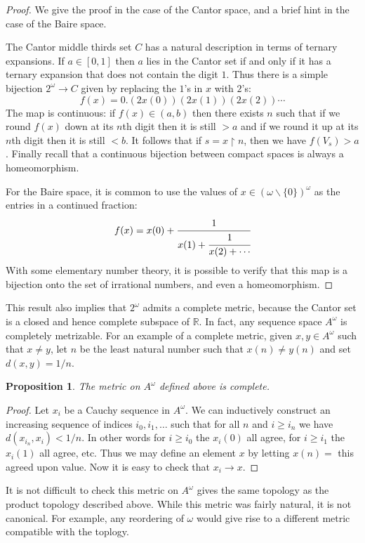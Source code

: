 \documentclass[11pt,oneside]{amsbook}
\newcommand{\R}{\mathbb R}
\theoremstyle{definition}
\theoremstyle{plain}
\newtheorem{proposition}[theorem]{Proposition}
\theoremstyle{definition}
\theoremstyle{remark}
\numberwithin{equation}{section}
\numberwithin{figure}{section}
\begin{document}
\begin{proof}
  We give the proof in the case of the Cantor space, and a brief hint in the case of the Baire space.

  The Cantor middle thirds set $C$ has a natural description in terms of ternary expansions. If $a\in[0,1]$ then $a$ lies in the Cantor set if and only if it has a ternary expansion that does not contain the digit $1$. Thus there is a simple bijection $2^\omega\to C$ given by replacing the $1$'s in $x$ with $2$'s:
\[f(x)=0.(2x(0))(2x(1))(2x(2))\cdots
\]
The map is continuous: if $f(x)\in(a,b)$ then there exists $n$ such that if we round $f(x)$ down at its $n$th digit then it is still $>a$ and if we round it up at its $n$th digit then it is still $<b$. It follows that if $s=x\restriction n$, then we have $f(V_s)>a$. Finally recall that a continuous bijection between compact spaces is always a homeomorphism.

  For the Baire space, it is common to use the values of $x\in(\omega\smallsetminus\{0\})^\omega$ as the entries in a continued fraction:
\[f(x)=x(0)+\cfrac{1}{x(1)+\cfrac{1}{x(2)+\cdots}}
\]
With some elementary number theory, it is possible to verify that this map is a bijection onto the set of irrational numbers, and even a homeomorphism.
\end{proof}

This result also implies that $2^\omega$ admits a complete metric, because the Cantor set is a closed and hence complete subspace of $\R$. In fact, any sequence space $A^\omega$ is completely metrizable. For an example of a complete metric, given $x,y\in A^\omega$ such that $x\neq y$, let $n$ be the least natural number such that $x(n)\neq y(n)$ and set $d(x,y)=1/n$. 

\begin{proposition}
  The metric on $A^\omega$ defined above is complete.
\end{proposition}

\begin{proof}
  Let $x_i$ be a Cauchy sequence in $A^\omega$. We can inductively construct an increasing sequence of indices $i_0,i_1,\ldots$ such that for all $n$ and $i\geq i_n$ we have $d(x_{i_n},x_i)<1/n$. In other words for $i\geq i_0$ the $x_i(0)$ all agree, for $i\geq i_1$ the $x_i(1)$ all agree, etc. Thus we may define an element $x$ by letting $x(n)=$ this agreed upon value. Now it is easy to check that $x_i\to x$.
\end{proof}

It is not difficult to check this metric on $A^\omega$ gives the same topology as the product topology described above. While this metric was fairly natural, it is not canonical. For example, any reordering of $\omega$ would give rise to a different metric compatible with the toplogy.
\end{document}
